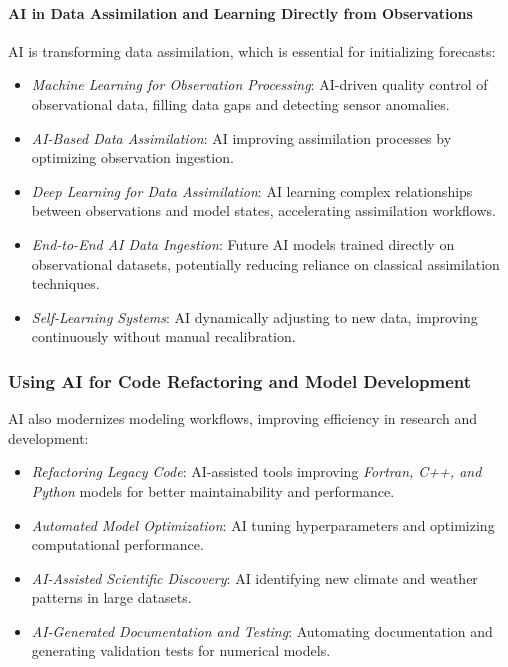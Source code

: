 \paragraph{AI in Data Assimilation and Learning Directly from Observations}
AI is transforming data assimilation, which is essential for initializing forecasts:
\begin{itemize}[itemsep=1pt,topsep=3pt]
    \item \emph{Machine Learning for Observation Processing}: AI-driven quality control of observational data, filling data gaps and detecting sensor anomalies.
    \item \emph{AI-Based Data Assimilation}: AI improving assimilation processes by optimizing observation ingestion.
		\item \emph{Deep Learning for Data Assimilation}: AI learning complex relationships between observations and model states, accelerating assimilation workflows.
    \item \emph{End-to-End AI Data Ingestion}: Future AI models trained directly on observational datasets, potentially reducing reliance on classical assimilation techniques.
    \item \emph{Self-Learning Systems}: AI dynamically adjusting to new data, improving continuously without manual recalibration.
\end{itemize}

\subsubsection{Using AI for Code Refactoring and Model Development}
AI also modernizes modeling workflows, improving efficiency in research and development:
\begin{itemize}[itemsep=1pt,topsep=3pt]
    \item \emph{Refactoring Legacy Code}: AI-assisted tools improving \emph{Fortran, C++, and Python} models for better maintainability and performance.
    \item \emph{Automated Model Optimization}: AI tuning hyperparameters and optimizing computational performance.
    \item \emph{AI-Assisted Scientific Discovery}: AI identifying new climate and weather patterns in large datasets.
    \item \emph{AI-Generated Documentation and Testing}: Automating documentation and generating validation tests for numerical models.
\end{itemize}

